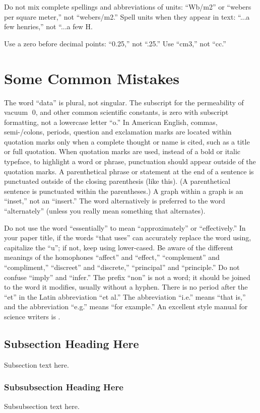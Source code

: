 \documentclass[conference,a4paper]{IEEEtran}
\begin{document}
Do not mix complete spellings and abbreviations of units: “Wb/m2” or “webers per square meter,” not “webers/m2.” Spell units when they appear in text: “...a few henries,” not “...a few H.

Use a zero before decimal points: “0.25,” not “.25.” Use “cm3,” not “cc.”


\vspace{7pt}
\section{Some Common Mistakes}
The word “data” is plural, not singular.
The subscript for the permeability of vacuum 0, and other common scientific constants, is zero with subscript formatting, not a lowercase letter “o.”
In American English, commas, semi-/colons, periods, question and exclamation marks are located within quotation marks only when a complete thought or name is cited, such as a title or full quotation. When quotation marks are used, instead of a bold or italic typeface, to highlight a word or phrase, punctuation should appear outside of the quotation marks. A parenthetical phrase or statement at the end of a sentence is punctuated outside of the closing parenthesis (like this). (A parenthetical sentence is punctuated within the parentheses.)
A graph within a graph is an “inset,” not an “insert.” The word alternatively is preferred to the word “alternately” (unless you really mean something that alternates).

Do not use the word “essentially” to mean “approximately” or “effectively.”
In your paper title, if the words “that uses” can accurately replace the word using, capitalize the “u”; if not, keep using lower-cased.
Be aware of the different meanings of the homophones “affect” and “effect,” “complement” and “compliment,” “discreet” and “discrete,” “principal” and “principle.”
Do not confuse “imply” and “infer.”
The prefix “non” is not a word; it should be joined to the word it modifies, usually without a hyphen.
There is no period after the “et” in the Latin abbreviation “et al.”
The abbreviation “i.e.” means “that is,” and the abbreviation “e.g.” means “for example.”
An excellent style manual for science writers is \cite{Young}.


\subsection{Subsection Heading Here}
Subsection text here.


\subsubsection{Subsubsection Heading Here}
Subsubsection text here.
\end{document}
